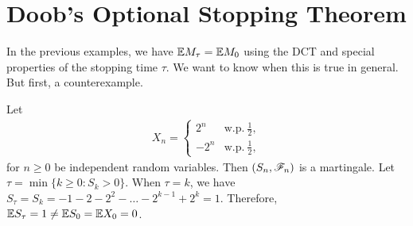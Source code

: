 \documentclass[12pt]{article}
\begin{document}
\section{Doob's Optional Stopping Theorem}

In the previous examples, we have $\E M_\tau = \E M_0$ using the DCT and special properties of the stopping time $\tau$. We want to know when this is true in general. But first, a counterexample.  

\begin{Example}[Counterexample]\label{wk13:ex:counter}
Let
\begin{align*}
X_n = 
\begin{cases} 
2^n & \text{w.p.}\  \frac{1}{2}, \\ 
-2^n & \text{w.p.}\ \frac{1}{2},
\end{cases} 
\end{align*}
for $n \geq 0$ be independent random variables. Then $(S_n, \mathscr{F}_n)$ is a martingale. Let $\tau = \min \{k \geq 0: S_k > 0\}$. When $\tau = k$, we have $S_\tau = S_k = -1 - 2 - 2^2 - \ldots -2^{k-1} + 2^k = 1$. Therefore, $\E S_\tau = 1 \neq \E S_0 = \E X_0 = 0$. 
\end{Example}
\end{document}
